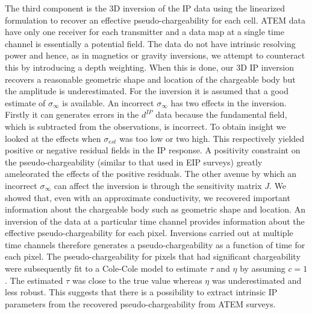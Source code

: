 \documentclass[extra,mreferee]{gji}
\newcommand{\siginf}{\sigma_\infty}
\begin{document}
The third component is the 3D inversion of the IP data using the linearized formulation to recover an effective pseudo-chargeability for each cell. ATEM data have only one receiver for each transmitter and a data map at a single time channel is essentially a potential field. The data do not have intrinsic resolving power and hence, as in magnetics or gravity inversions, we attempt to counteract this by introducing a depth weighting.  When this is done, our 3D IP inversion recovers a reasonable geometric shape and location of the chargeable body but the amplitude is underestimated. For the inversion it is assumed that a good estimate of $\siginf$ is available. An incorrect $\siginf$ has two effects in the inversion. Firstly it can generates errors in the $d^{IP}$ data because the fundamental field, which is subtracted from the observations, is incorrect. To obtain insight we looked at the effects when $\sigma_{est}$ was too low or two high. This respectively yielded positive or negative residual fields in the IP response. A positivity constraint on the pseudo-chargeability (similar to that used in EIP surveys) greatly ameleorated the effects of the positive residuals. The other avenue by which an incorrect $\siginf$ can affect the inversion is through the sensitivity matrix $J$. We showed that, even with an approximate conductivity, we recovered important information about the chargeable body such as geometric shape and location. An inversion of the data at a particular time channel provides information about the effective pseudo-chargeability for each pixel. Inversions carried out at multiple time channels therefore generates a pseudo-chargeability as a function of time for each pixel. The pseudo-chargeability for pixels that had significant chargeability were subsequently fit to a Cole-Cole model to estimate $\tau$ and $\eta$ by assuming $c=1$. The estimated $\tau$ was close to the true value whereas $\eta$ was underestimated and less robust. This suggests that there is a possibility to extract intrinsic IP parameters from the recovered pseudo-chargeability from ATEM surveys.
\end{document}
